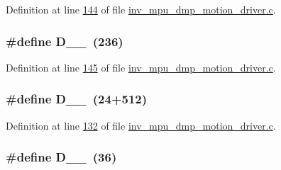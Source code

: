 Definition at line \hyperlink{inv__mpu__dmp__motion__driver_8c_source_l00144}{144} of file \hyperlink{inv__mpu__dmp__motion__driver_8c_source}{inv\+\_\+mpu\+\_\+dmp\+\_\+motion\+\_\+driver.\+c}.

\subsubsection[{\texorpdfstring{D\+\_\+0\+\_\+236}{D_0_236}}]{\setlength{\rightskip}{0pt plus 5cm}\#define D\+\_\+\_~(236)}\hypertarget{group___d_r_i_v_e_r_s_ga9141d44a2f2636d23c001b5832118326}{}\label{group___d_r_i_v_e_r_s_ga9141d44a2f2636d23c001b5832118326}


Definition at line \hyperlink{inv__mpu__dmp__motion__driver_8c_source_l00145}{145} of file \hyperlink{inv__mpu__dmp__motion__driver_8c_source}{inv\+\_\+mpu\+\_\+dmp\+\_\+motion\+\_\+driver.\+c}.

\subsubsection[{\texorpdfstring{D\+\_\+0\+\_\+24}{D_0_24}}]{\setlength{\rightskip}{0pt plus 5cm}\#define D\+\_\+\_~(24+512)}\hypertarget{group___d_r_i_v_e_r_s_ga15d46d25c01d6bc9c849c3ba42dcfa54}{}\label{group___d_r_i_v_e_r_s_ga15d46d25c01d6bc9c849c3ba42dcfa54}


Definition at line \hyperlink{inv__mpu__dmp__motion__driver_8c_source_l00132}{132} of file \hyperlink{inv__mpu__dmp__motion__driver_8c_source}{inv\+\_\+mpu\+\_\+dmp\+\_\+motion\+\_\+driver.\+c}.

\subsubsection[{\texorpdfstring{D\+\_\+0\+\_\+36}{D_0_36}}]{\setlength{\rightskip}{0pt plus 5cm}\#define D\+\_\+\_~(36)}\hypertarget{group___d_r_i_v_e_r_s_ga98e58a52ab30dcc007284b185347cf0f}{}\label{group___d_r_i_v_e_r_s_ga98e58a52ab30dcc007284b185347cf0f}


